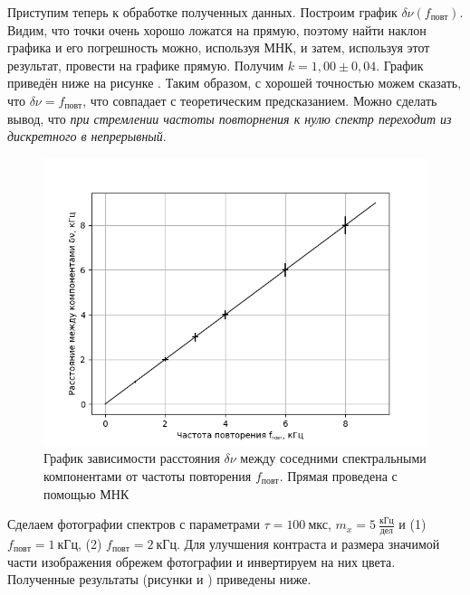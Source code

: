 \documentclass[a4paper,10pt]{article}
\begin{document}
Приступим теперь к обработке полученных данных. Построим график $\delta\nu\left(f_{\text{повт}}\right)$. Видим, что точки очень хорошо ложатся на прямую, поэтому найти наклон графика и его погрешность можно, используя МНК, и затем, используя этот результат, провести на графике прямую. Получим $k=1,00\pm0,04$. График приведён ниже на рисунке . Таким образом, с хорошей точностью можем сказать, что $\delta\nu=f_{повт}$, что совпадает с теоретическим предсказанием. Можно сделать вывод, что \textit{при стремлении частоты повторнения к нулю спектр переходит из дискретного в непрерывный}.

\begin{figure}[h]
	\centering
	\includegraphics[scale=0.75]{Plot_B}
	\caption{График зависимости расстояния $\delta\nu$ между соседними спектральными компонентами от частоты повторения $f_{повт}$. Прямая проведена с помощью МНК} \label{Plot_B}
\end{figure}

Сделаем фотографии спектров с параметрами $\tau=100~\text{мкс}$, $m_x=5~\frac{\text{кГц}}{\text{дел}}$ и (1) $f_{повт}=1~\text{кГц}$, (2) $f_{повт}=2~\text{кГц}$. Для улучшения контраста и размера значимой части изображения обрежем фотографии и инвертируем на них цвета. Полученные результаты (рисунки  и ) приведены ниже.
\end{document}
